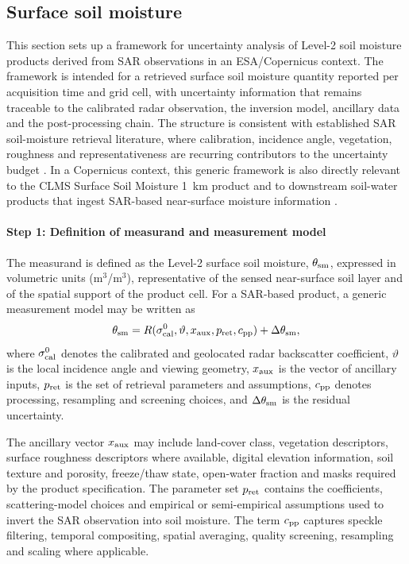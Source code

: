 \subsection{Surface soil moisture}

This section sets up a framework for uncertainty analysis of Level-2 soil moisture
products derived from \ac{SAR} observations in an ESA/Copernicus context. The
framework is intended for a retrieved surface soil moisture quantity reported
per acquisition time and grid cell, with uncertainty information that remains
traceable to the calibrated radar observation, the inversion model, ancillary
data and the post-processing chain. The structure is consistent with established
\ac{SAR} soil-moisture retrieval literature, where calibration, incidence
angle, vegetation, roughness and representativeness are recurring contributors
to the uncertainty budget \cite{wagner07,zribi11,piles21,massart24}. In a
Copernicus context, this generic framework is also directly relevant to the
CLMS Surface Soil Moisture 1~km product and to downstream soil-water products
that ingest SAR-based near-surface moisture information \cite{clms_ssm1km,clms_swi}.

\paragraph{Step 1: Definition of measurand and measurement model}

The measurand is defined as the Level-2 surface soil moisture,
$\theta_{\rm sm}$, expressed in volumetric units (m$^3$/m$^3$), representative of
the sensed near-surface soil layer and of the spatial support of the product
cell. For a \ac{SAR}-based product, a generic measurement model may be written
as
\begin{equation}
  \theta_{\rm sm} = R(\sigma^0_{\rm cal}, \vartheta, x_{\rm aux}, p_{\rm ret}, c_{\rm pp}) + \Delta\theta_{\rm sm},
  \label{eq:sm_measurement_model}
\end{equation}
where $\sigma^0_{\rm cal}$ denotes the calibrated and geolocated radar
backscatter coefficient, $\vartheta$ is the local incidence angle and viewing
geometry, $x_{\rm aux}$ is the vector of ancillary inputs, $p_{\rm ret}$ is the
set of retrieval parameters and assumptions, $c_{\rm pp}$ denotes processing,
resampling and screening choices, and $\Delta\theta_{\rm sm}$ is the residual
uncertainty.

\noindent The ancillary vector $x_{\rm aux}$ may include land-cover class,
vegetation descriptors, surface roughness descriptors where available, digital
elevation information, soil texture and porosity, freeze/thaw state,
open-water fraction and masks required by the product specification. The
parameter set $p_{\rm ret}$ contains the coefficients, scattering-model choices
and empirical or semi-empirical assumptions used to invert the \ac{SAR}
observation into soil moisture. The term $c_{\rm pp}$ captures speckle
filtering, temporal compositing, spatial averaging, quality screening,
resampling and scaling where applicable.

